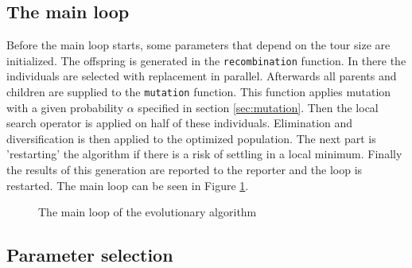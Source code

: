 \documentclass[a4paper,10pt]{article}
\newcommand{\ReplaceMe}[1]{{\color{blue}#1}}
\begin{document}
\subsection{The main loop}


Before the main loop starts, some parameters that depend on the tour size are initialized. The offspring is generated in the \texttt{recombination} function. In there the individuals are selected with replacement in parallel. Afterwards all parents and children are supplied to the \texttt{mutation} function. This function applies mutation with a given probability $\alpha$ specified in section \ref{sec:mutation}. Then the local search operator is applied on half of these individuals. Elimination and diversification is then applied to the optimized population. The next part is 'restarting' the algorithm if there is a risk of settling in a local minimum. Finally the results of this generation are reported to the reporter and the loop is restarted. The main loop can be seen in Figure \ref{code:main}.

\begin{figure}
\caption{The main loop of the evolutionary algorithm}
\label{code:main}
\end{figure}


\subsection{Parameter selection} \label{sec:hyperparameter}

\end{document}

